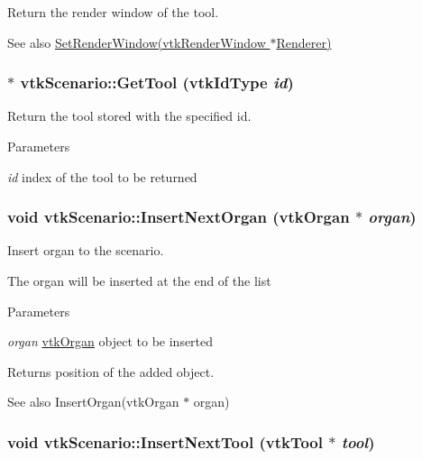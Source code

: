 Return the render window of the tool. 

\begin{DoxySeeAlso}{See also}
\hyperlink{classvtkScenario_a65e86f64884268d0e100345d472a35c8}{SetRenderWindow(vtkRenderWindow $\ast$Renderer)} 
\end{DoxySeeAlso}
\hypertarget{classvtkScenario_a16431d22983601557b1ea7fb3e62bc21}{
\subsubsection[{GetTool}]{ $\ast$ vtkScenario::GetTool (vtkIdType {\em id})}}
\label{classvtkScenario_a16431d22983601557b1ea7fb3e62bc21}


Return the tool stored with the specified id. 


\begin{DoxyParams}{Parameters}
\item[{\em id}]index of the tool to be returned \end{DoxyParams}
\hypertarget{classvtkScenario_ab7aa43b4f165675fdfc437e142a466f3}{
\subsubsection[{InsertNextOrgan}]{\setlength{\rightskip}{0pt plus 5cm}void vtkScenario::InsertNextOrgan ({\bf vtkOrgan} $\ast$ {\em organ})}}
\label{classvtkScenario_ab7aa43b4f165675fdfc437e142a466f3}


Insert organ to the scenario. 

The organ will be inserted at the end of the list 
\begin{DoxyParams}{Parameters}
\item[{\em organ}]\hyperlink{classvtkOrgan}{vtkOrgan} object to be inserted \end{DoxyParams}
\begin{DoxyReturn}{Returns}
position of the added object. 
\end{DoxyReturn}
\begin{DoxySeeAlso}{See also}
InsertOrgan(vtkOrgan $\ast$ organ) 
\end{DoxySeeAlso}
\hypertarget{classvtkScenario_a5fd09f275e65e233038c0a6662bc2604}{
\subsubsection[{InsertNextTool}]{\setlength{\rightskip}{0pt plus 5cm}void vtkScenario::InsertNextTool ({\bf vtkTool} $\ast$ {\em tool})}}
\label{classvtkScenario_a5fd09f275e65e233038c0a6662bc2604}


